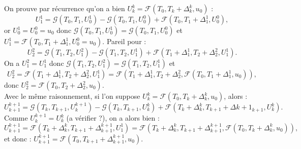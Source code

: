 \documentclass[review,onefignum,onetabnum]{siamart220329}
\newcommand{\G}{\mathcal{G}}
\newcommand{\F}{\mathcal{F}}
\begin{document}
On prouve par récurrence qu'on a bien $U^{k}_{k} = \F(T_0,T_{k} + \Delta^k_k,u_0)$ :
\begin{equation}
U^1_1 = \G(T_{0},T_{1},U^{1}_{0}) - \G(T_{0},T_{1},U^{0}_{0}) + \F(T_{0},T_{1} + \Delta^1_1,U^{0}_{0}),
\end{equation}
or $U^1_0 = U^0_0 = u_0$ donc $\G(T_{0},T_{1},U^{1}_{0}) = \G(T_{0},T_{1},U^{0}_{0})$ et $U^1_1 = \F(T_{0},T_{1} + \Delta^1_1,U^{0}_{0} = u_0)$. Pareil pour :
\begin{equation}
U^2_2 = \G(T_{1},T_{2},U^{2}_{1}) - \G(T_{1},T_{2},U^{1}_{1}) + \F(T_{1} + \Delta^1_1 ,T_{2} + \Delta^2_2,U^{1}_{1}).
\end{equation}
On a $U^2_1 = U^1_1$ donc $\G(T_{1},T_{2},U^{2}_{1}) = \G(T_{1},T_{2},U^{1}_{1})$ et 
\begin{equation}
U^2_2 = \F(T_{1} + \Delta^1_1 ,T_{2} + \Delta^2_2,U^{1}_{1}) = \F(T_{1} + \Delta^1_1 ,T_{2} + \Delta^2_2,\F(T_{0},T_{1} + \Delta^1_1,u_0)),
\end{equation}
donc $U^2_2 = \F(T_{0},T_{2} + \Delta^2_2,u_0)$.\\
Avec le même raisonnement, si l'on suppose $U^k_k = \F(T_{0},T_{k} + \Delta^k_k,u_0)$, alors :
\begin{equation}
U^{k+1}_{k+1} = \G(T_{k},T_{k+1},U^{k+1}_{k}) - \G(T_{k},T_{k+1},U^{k}_{k}) + \F(T_{k} + \Delta^k_k ,T_{k+1} + \Delta{k+1}_{k+1},U^{k}_{k}).
\end{equation}
Comme $U^{k+1}_k = U^k_k$ (a vérifier ?), on a alors bien :
\begin{equation}
U^{k+1}_{k+1} = \F(T_{k} + \Delta^k_k ,T_{k+1} + \Delta^{k+1}_{k+1},U^{1}_{1}) = \F(T_{k} + \Delta^k_k ,T_{k+1} + \Delta^{k+1}_{k+1},\F(T_{0},T_{k} + \Delta^k_k,u_0)),
\end{equation}
et donc : $U^{k+1}_{k+1} = \F(T_{0},T_{k+1} + \Delta^{k+1}_{k+1},u_0)$.
\end{document}
